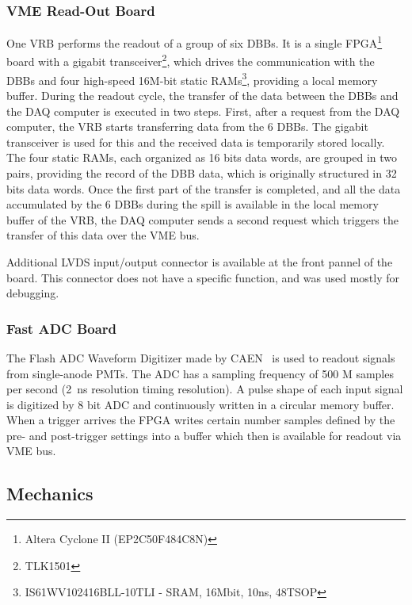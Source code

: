 \documentclass[a4paper,11pt]{article}
\begin{document}
\subsubsection{VME Read-Out Board}\label{electronics:subsec:vme_readout_board}

One VRB performs the readout of a group of six DBBs. It is a single FPGA\footnote{Altera Cyclone II (EP2C50F484C8N)} board with a gigabit 
transceiver\footnote{TLK1501}, which drives the communication with the DBBs and four high-speed 16M-bit static RAMs\footnote{IS61WV102416BLL-10TLI - SRAM,
16Mbit, 10ns, 48TSOP}, providing a local memory buffer. During the readout cycle, the transfer of the data between the DBBs and the DAQ computer is executed
in two steps. First, after a request from the DAQ computer, the VRB starts transferring data from the 6 DBBs. The gigabit transceiver is used for this and
the received data is temporarily stored locally. The four static RAMs, each organized as 16 bits data words, are grouped in two pairs, providing the record of the
DBB data, which is originally structured in 32 bits data words. Once the first part of the transfer is completed, and all the data accumulated by the 6 DBBs
during the spill is available in the local memory buffer of the VRB, the DAQ computer sends a second request which triggers the transfer of this data over
the VME bus.

Additional LVDS input/output connector is available at the front pannel of the board. This connector does not have a specific function, and was used mostly
for debugging.

\subsubsection{Fast ADC Board}\label{electronics:subsec:fast_adc_board}

The Flash ADC Waveform Digitizer made by CAEN~\cite{V1731} is used to readout signals from single-anode PMTs. The ADC has a sampling frequency of 500 M
samples per second (2~ns resolution timing resolution). A pulse shape of each input signal is digitized by 8 bit ADC and continuously written in a circular
memory buffer. When a trigger arrives the FPGA writes certain number samples defined by the pre- and post-trigger settings into a buffer which then is
available for readout via VME bus.


\subsection{Mechanics}\label{design:subsec:mechanics}
\end{document}
